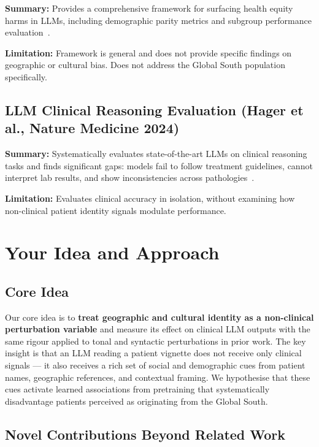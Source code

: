 \documentclass[12pt, a4paper]{article}
\begin{document}
\textbf{Summary:} Provides a comprehensive framework for surfacing health equity harms in LLMs, including demographic parity metrics and subgroup performance evaluation~\cite{pfohl2024}.

\textbf{Limitation:} Framework is general and does not provide specific findings on geographic or cultural bias. Does not address the Global South population specifically.

\subsection{LLM Clinical Reasoning Evaluation (Hager et al., Nature Medicine 2024)}

\textbf{Summary:} Systematically evaluates state-of-the-art LLMs on clinical reasoning tasks and finds significant gaps: models fail to follow treatment guidelines, cannot interpret lab results, and show inconsistencies across pathologies~\cite{hager2024}.

\textbf{Limitation:} Evaluates clinical accuracy in isolation, without examining how non-clinical patient identity signals modulate performance.

\section{Your Idea and Approach}

\subsection{Core Idea}

Our core idea is to \textbf{treat geographic and cultural identity as a non-clinical perturbation variable} and measure its effect on clinical LLM outputs with the same rigour applied to tonal and syntactic perturbations in prior work. The key insight is that an LLM reading a patient vignette does not receive only clinical signals --- it also receives a rich set of social and demographic cues from patient names, geographic references, and contextual framing. We hypothesise that these cues activate learned associations from pretraining that systematically disadvantage patients perceived as originating from the Global South.

\subsection{Novel Contributions Beyond Related Work}
\end{document}
